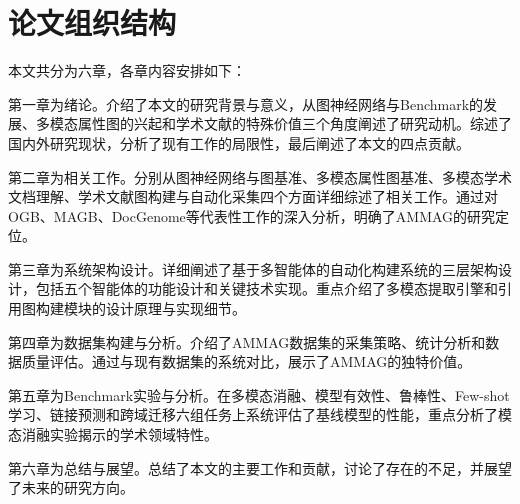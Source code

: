 \section{论文组织结构}

本文共分为六章，各章内容安排如下：

第一章为绪论。介绍了本文的研究背景与意义，从图神经网络与Benchmark的发展、多模态属性图的兴起和学术文献的特殊价值三个角度阐述了研究动机。综述了国内外研究现状，分析了现有工作的局限性，最后阐述了本文的四点贡献。

第二章为相关工作。分别从图神经网络与图基准、多模态属性图基准、多模态学术文档理解、学术文献图构建与自动化采集四个方面详细综述了相关工作。通过对OGB、MAGB、DocGenome等代表性工作的深入分析，明确了AMMAG的研究定位。

第三章为系统架构设计。详细阐述了基于多智能体的自动化构建系统的三层架构设计，包括五个智能体的功能设计和关键技术实现。重点介绍了多模态提取引擎和引用图构建模块的设计原理与实现细节。

第四章为数据集构建与分析。介绍了AMMAG数据集的采集策略、统计分析和数据质量评估。通过与现有数据集的系统对比，展示了AMMAG的独特价值。

第五章为Benchmark实验与分析。在多模态消融、模型有效性、鲁棒性、Few-shot学习、链接预测和跨域迁移六组任务上系统评估了基线模型的性能，重点分析了模态消融实验揭示的学术领域特性。

第六章为总结与展望。总结了本文的主要工作和贡献，讨论了存在的不足，并展望了未来的研究方向。
